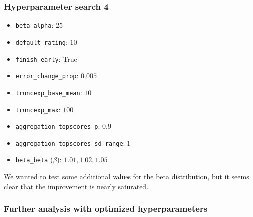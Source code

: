 \documentclass[12pt,a4paper]{article}
\begin{document}
\subsubsection{Hyperparameter search 4}


\begin{itemize}

\item \lstinline|beta_alpha|: $25$
\item \lstinline|default_rating|: $10$
\item \lstinline|finish_early|: True
\item \lstinline|error_change_prop|: $0.005$
\item \lstinline|truncexp_base_mean|: $10$
\item \lstinline|truncexp_max|: $100$
\item \lstinline|aggregation_topscores_p|: $0.9$
\item \lstinline|aggregation_topscores_sd_range|: $1$

\end{itemize}


\begin{itemize}

\item \lstinline|beta_beta| ($\beta$): $1.01, 1.02, 1.05$

\end{itemize}


\begin{center}
\end{center}


We wanted to test some additional values for the beta distribution, but it seems clear that the improvement is nearly saturated.\\

\subsubsection{Further analysis with optimized hyperparameters}
\end{document}
